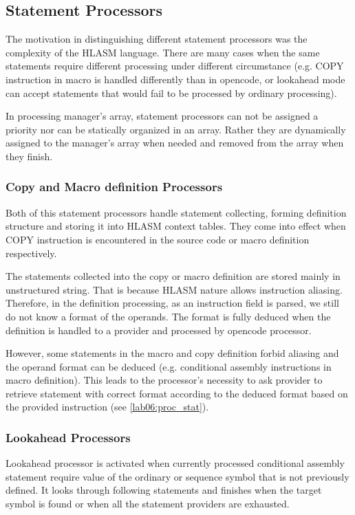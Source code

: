 \subsection{Statement Processors}
\label{lab06:sect_proc}

The motivation in distinguishing different statement processors was the complexity of the HLASM language. There are many cases when the same statements require different processing under different circumstance (e.g. COPY instruction in macro is handled differently than in opencode, or lookahead mode can accept statements that would fail to be processed by ordinary processing).

In processing manager's array, statement processors can not be assigned a priority nor can be statically organized in an array. Rather they are dynamically assigned to the manager's array when needed and removed from the array when they finish.


\subsubsection{Copy and Macro definition Processors}

Both of this statement processors handle statement collecting, forming definition structure and storing it into HLASM context tables. They come into effect when COPY instruction is encountered in the source code or macro definition respectively. 

The statements collected into the copy or macro definition are stored mainly in unstructured string. That is because HLASM nature allows instruction aliasing. Therefore, in the definition processing, as an instruction field is parsed, we still do not know a format of the operands. The format is fully deduced when the definition is handled to a provider and processed by opencode processor.

However, some statements in the macro and copy definition forbid aliasing and the operand format can be deduced (e.g. conditional assembly instructions in macro definition). This leads to the processor's necessity to ask provider to retrieve statement with correct format according to the deduced format based on the provided instruction  (see \cref{lab06:proc_stat}).

\subsubsection{Lookahead Processors}

Lookahead processor is activated when currently processed conditional assembly statement require value of the ordinary or sequence symbol that is not previously defined. It looks through following statements and finishes when the target symbol is found or when all the statement providers are exhausted.

